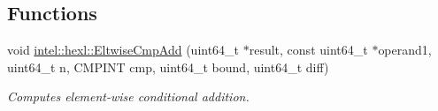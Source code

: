 \subsection*{Functions}
\begin{DoxyCompactItemize}
\item 
void \hyperlink{namespaceintel_1_1hexl_a5c4fd2ceb53b94efa5f5a959d7ee9819}{intel\+::hexl\+::\+Eltwise\+Cmp\+Add} (uint64\+\_\+t $\ast$result, const uint64\+\_\+t $\ast$operand1, uint64\+\_\+t n, C\+M\+P\+I\+NT cmp, uint64\+\_\+t bound, uint64\+\_\+t diff)
\begin{DoxyCompactList}\small\item\em Computes element-\/wise conditional addition. \end{DoxyCompactList}\end{DoxyCompactItemize}
